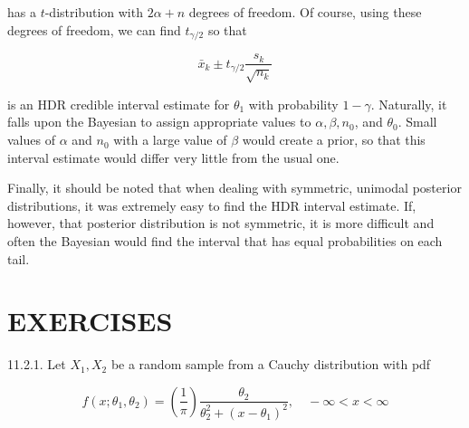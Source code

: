 has a $t$-distribution with $2 \alpha+n$ degrees of freedom. Of course, using these degrees of freedom, we can find $t_{\gamma / 2}$ so that

$$
\bar{x}_{k} \pm t_{\gamma / 2} \frac{s_{k}}{\sqrt{n_{k}}}
$$

is an HDR credible interval estimate for $\theta_{1}$ with probability $1-\gamma$. Naturally, it falls upon the Bayesian to assign appropriate values to $\alpha, \beta, n_{0}$, and $\theta_{0}$. Small values of $\alpha$ and $n_{0}$ with a large value of $\beta$ would create a prior, so that this interval estimate would differ very little from the usual one.

Finally, it should be noted that when dealing with symmetric, unimodal posterior distributions, it was extremely easy to find the HDR interval estimate. If, however, that posterior distribution is not symmetric, it is more difficult and often the Bayesian would find the interval that has equal probabilities on each tail.

\section*{EXERCISES}
11.2.1. Let $X_{1}, X_{2}$ be a random sample from a Cauchy distribution with pdf

$$
f\left(x ; \theta_{1}, \theta_{2}\right)=\left(\frac{1}{\pi}\right) \frac{\theta_{2}}{\theta_{2}^{2}+\left(x-\theta_{1}\right)^{2}}, \quad-\infty<x<\infty
$$

